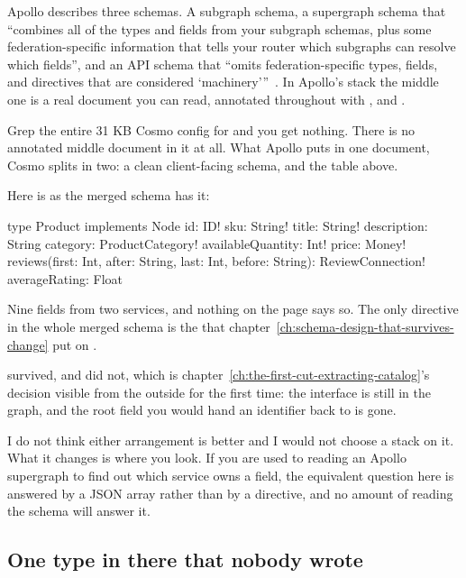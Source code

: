 Apollo describes three schemas. A subgraph schema, a supergraph schema that
\enquote{combines all of the types and fields from your subgraph schemas, plus
some federation-specific information that tells your router which subgraphs can
resolve which fields}, and an API schema that \enquote{omits federation-specific
types, fields, and directives that are considered
\enquote{machinery}}~\autocite{apollo2026schematypes}. In Apollo's stack the
middle one is a real document you can read, annotated throughout with
,  and .

Grep the entire 31 KB Cosmo config for  and you get nothing.
There is no annotated middle document in it at all. What Apollo puts in one
document, Cosmo splits in two: a clean client-facing schema, and the
 table above.

Here is  as the merged schema has it:

\begin{graphqlsdl}
type Product implements Node {
  id: ID!
  sku: String!
  title: String!
  description: String
  category: ProductCategory!
  availableQuantity: Int!
  price: Money!
  reviews(first: Int, after: String, last: Int, before: String): ReviewConnection!
  averageRating: Float
}
\end{graphqlsdl}

Nine fields from two services, and nothing on the page says so. The only
directive in the whole merged schema is the  that
chapter~\ref{ch:schema-design-that-survives-change} put on .

%
 survived, and  did not, which is
chapter~\ref{ch:the-first-cut-extracting-catalog}'s decision visible from the
outside for the first time: the interface is still in the graph, and the root
field you would hand an identifier back to is gone.

I do not think either arrangement is better and I would not choose a stack on
it. What it changes is where you look. If you are used to reading an Apollo
supergraph to find out which service owns a field, the equivalent question here
is answered by a JSON array rather than by a directive, and no amount of reading
the schema will answer it.

\subsection*{One type in there that nobody wrote}

